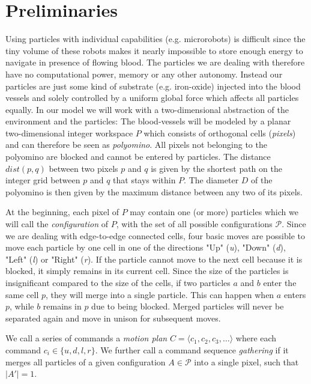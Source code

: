 \section{Preliminaries} \label{sec:TDDPreliminaries}
Using particles with individual capabilities (e.g. microrobots) is difficult since the tiny volume of these robots makes it nearly impossible to store enough energy to navigate in presence of flowing blood. The particles we are dealing with therefore have no computational power, memory or any other autonomy. Instead our particles are just some kind of substrate (e.g. iron-oxide) injected into the blood vessels and solely controlled by a uniform global force which affects all particles equally. In our model we will work with a two-dimensional abstraction of the environment and the particles: The blood-vessels will be modeled by a planar two-dimensional integer workspace $P$ which consists of orthogonal cells (\textit{pixels}) and can therefore be seen as \textit{polyomino}. All pixels not belonging to the polyomino are blocked and cannot be entered by particles. The distance $dist(p, q)$ between two pixels $p$ and $q$ is given by the shortest path on the integer grid between $p$ and $q$ that stays within $P$. The diameter $D$ of the polyomino is then given by the maximum distance between any two of its pixels. 

At the beginning, each pixel of $P$ may contain one (or more) particles which we will call the \textit{configuration} of $P$, with the set of all possible configurations $\mathcal{P}$. Since we are dealing with edge-to-edge connected cells, four basic moves are possible to move each particle by one cell in one of the directions "Up" (\textit{u}), "Down" (\textit{d}), "Left" (\textit{l}) or "Right" (\textit{r}). If the particle cannot move to the next cell because it is blocked, it simply remains in its current cell. Since the size of the particles is insignificant compared to the size of the cells, if two particles $a$ and $b$ enter the same cell $p$, they will merge into a single particle. This can happen when $a$ enters $p$, while $b$ remains in $p$ due to being blocked. Merged particles will never be separated again and move in unison for subsequent moves.

We call a series of commands a \textit{motion plan} $C = \langle c_1, c_2, c_3, \dots \rangle$ where each command $c_i \in \{u, d, l, r\}$. We further call a command sequence \textit{gathering} if it merges all particles of a given configuration $A \in \mathcal{P}$ into a single pixel, such that $|A'| = 1$. 

